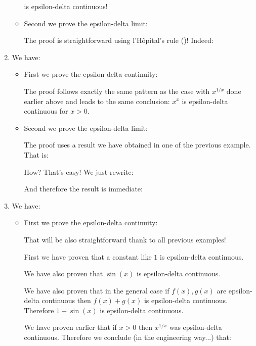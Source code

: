 \begin{enumerate}
\begin{itemize}
			is epsilon-delta continuous!
			
			\item Second we prove the epsilon-delta limit:
			
			The proof is straightforward using l'Hôpital's rule ()! Indeed:
			
			
		\end{itemize}
		
		\item We have:
		
		
		\begin{itemize}
			\item First we prove the epsilon-delta continuity:
			
			The proof follows exactly the same pattern as the case with $x^{1/x}$ done earlier above and leads to the same conclusion: $x^x$ is epsilon-delta continuous for $x>0$.
			
			\item Second we prove the epsilon-delta limit:
			
			The proof uses a result we have obtained in one of the previous example. That is:
			
			How? That's easy! We just rewrite:
			
			And therefore the result is immediate:
			
			
		\end{itemize}
		
		\item We have:
		
		
		\begin{itemize}
			\item First we prove the epsilon-delta continuity:
			
			That will be also straightforward thank to all previous examples!
			
			First we have proven that a constant like $1$ is epsilon-delta continuous.
			
			We have also proven that $\sin(x)$ is epsilon-delta continuous.
			
			We have also proven that in the general case if $f(x),g(x)$ are epsilon-delta continuous then $f(x)+g(x)$ is epsilon-delta continuous. Therefore $1+\sin(x)$ is epsilon-delta continuous.
			
			We have proven earlier that if $x>0$ then $x^{1/x}$ was epsilon-delta continuous. Therefore we conclude (in the engineering way...) that:
			

\end{itemize}
\end{enumerate}
